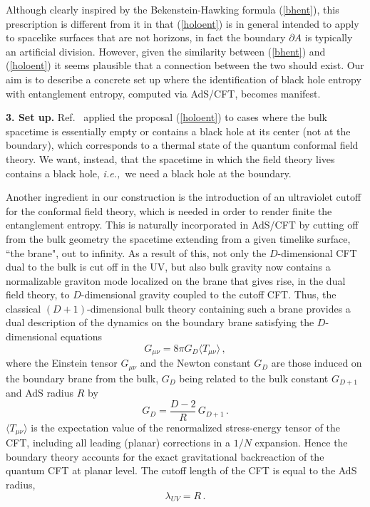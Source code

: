 \documentclass[12pt]{article}
\newcommand{\beq}{\begin{equation}}
\newcommand{\eeq}{\end{equation}}
\newcommand{\ie}{{\it i.e.,}\ }
\newcommand{\reef}[1]{(\ref{#1})}
\begin{document}
Although clearly inspired by the Bekenstein-Hawking formula
\reef{bhent}, this prescription is different from it in that
\reef{holoent} is in general intended to apply to spacelike surfaces
that are not horizons, in fact the boundary $\partial A$ is typically an
artificial division. However, given the similarity between \reef{bhent}
and \reef{holoent} it seems plausible that a connection between the two
should exist. Our aim is to describe a concrete set up where the
identification of black hole entropy with entanglement entropy, computed
via AdS/CFT, becomes manifest.

\bigskip

\noindent\textbf{3. Set up.} Ref.~\cite{ryta} applied the proposal
\reef{holoent} to cases where the bulk spacetime is essentially empty or
contains a black hole at its center (not at the boundary), which
corresponds to a thermal state of the quantum conformal field theory. We
want, instead, that the spacetime in which the field theory lives
contains a black hole, \ie we need a black hole at the boundary.

Another ingredient in our construction is the introduction of an
ultraviolet cutoff for the conformal field theory, which is needed in
order to render finite the entanglement entropy. This is naturally
incorporated in AdS/CFT by cutting off from the bulk geometry the
spacetime extending from a given timelike surface, ``the brane", out to
infinity. As a result of this, not only the $D$-dimensional CFT dual to
the bulk is cut off in the UV, but also bulk gravity now contains a
normalizable graviton mode localized on the brane \cite{rs2} that gives
rise, in the dual field theory, to $D$-dimensional gravity coupled to
the cutoff CFT. Thus, the classical $(D+1)$-dimensional bulk theory
containing such a brane provides a dual description of the dynamics on
the boundary brane satisfying the $D$-dimensional equations
\cite{gubser}
\beq\label{dualeqs}
G_{\mu\nu}=8\pi G_{D}\langle T_{\mu\nu}\rangle\,,
\eeq 
where the Einstein tensor $G_{\mu\nu}$ and the Newton constant $G_{D}$
are those induced on the boundary brane from the bulk, $G_{D}$ being
related to the bulk constant $G_{D+1}$ and AdS radius $R$ by
\beq\label{gg}
G_{D}=\frac{D-2}{R}\,G_{D+1}\,.
\eeq
$\langle T_{\mu\nu}\rangle$ is the expectation value of the renormalized
stress-energy tensor of the CFT, including all leading (planar)
corrections in a $1/N$ expansion. Hence the boundary theory accounts for
the exact gravitational backreaction of the quantum CFT at planar level.
The cutoff length of the CFT is equal to the AdS radius,
\beq\label{uvcutoff}
\lambda_{UV}=R\,. 
\eeq
\end{document}
